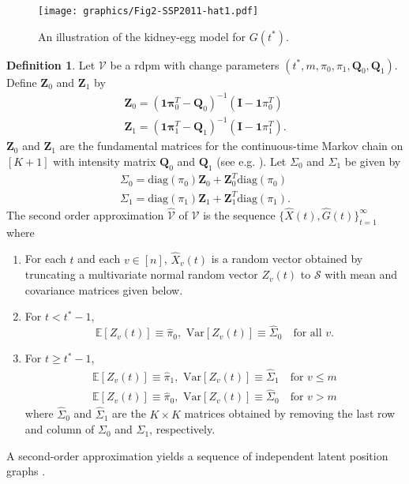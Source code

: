 \documentclass[10pt,journal,compsoc]{IEEEtran}
\theoremstyle{definition}
\newtheorem{definition}{Definition}
\begin{document}
\begin{figure}[!tp]
  \centering
  \texttt{[image: graphics/Fig2-SSP2011-hat1.pdf]}
  \caption{An illustration of the kidney-egg model for $G(t^{*})$.}
  \label{fig:kidney-egg}
\end{figure}
 \begin{definition}
  \label{def:2}
  Let $\mathscr{V}$ be a rdpm with change parameters $(t^{*}, m,
  \pi_0, \pi_1, \mathbf{Q}_0, \mathbf{Q}_1)$. Define
  $\mathbf{Z}_0$ and $\mathbf{Z}_1$ by
  \begin{gather}
    \mathbf{Z}_0 = (\mathbf{1}\mathbf{\pi}_0^{T} -
     \mathbf{Q}_0)^{-1}(\mathbf{I} - \mathbf{1}\pi_0^{T}) \\
    \mathbf{Z}_1 = (\mathbf{1}\mathbf{\pi}_1^{T} -
     \mathbf{Q}_1)^{-1}(\mathbf{I} - \mathbf{1}\pi_1^{T}).
  \end{gather}
  $\mathbf{Z}_0$ and $\mathbf{Z}_1$ are the fundamental matrices
  for the continuous-time Markov chain on $[K+1]$ with intensity
  matrix $\mathbf{Q}_0$ and $\mathbf{Q}_1$ (see
  e.g. \cite[p. 55]{asmussen03:_applied_probab_queues}). Let
  $\Sigma_0$ and $\Sigma_1$ be given by
  \begin{gather*}
    \Sigma_0 = \mathrm{diag}(\pi_0) \mathbf{Z}_0 +
    \mathbf{Z}_0^{T}
    \mathrm{diag}(\pi_0) \\
    \Sigma_1 = \mathrm{diag}(\pi_1) \mathbf{Z}_1 +
    \mathbf{Z}_1^{T}
    \mathrm{diag}(\pi_1).
  \end{gather*}
  The second order approximation $\widehat{\mathscr{V}}$ of
  $\mathscr{V}$ is the sequence $\{\widehat{X}(t),
  \widehat{G}(t)\}_{t=1}^{\infty}$ where
  \begin{enumerate}
  \item For each $t$ and each $v \in [n]$, $\widehat{X}_v(t)$ is a
    random vector obtained by truncating a multivariate normal random
    vector $Z_{v}(t)$ to $\mathscr{S}$ with mean and covariance
    matrices given below.
  \item For $t < t^{*} - 1$,
    \begin{equation}
      \mathbb{E}[Z_v(t)] \equiv \hat{\pi}_0, \,\, 
  \mathrm{Var}[Z_v(t)] \equiv \widehat{\Sigma}_0 \quad \text{for all
    $v$}.
    \end{equation}
  \item For $t \geq t^{*} - 1$,  
    \begin{gather*}
      \mathbb{E}[Z_v(t)] \equiv \hat{\pi}_1, \,\, 
\mathrm{Var}[Z_v(t)] \equiv \widehat{\Sigma}_{1} \quad \text{for $v
  \leq m$} \\
  \mathbb{E}[Z_v(t)] \equiv \hat{\pi}_0, \,\, \mathrm{Var}[Z_v(t)] \equiv \widehat{\Sigma}_{0} \quad \text{for $v
        > m$}
    \end{gather*}
    where $\widehat{\Sigma}_0$ and $\widehat{\Sigma}_1$ are the $K
    \times K$ matrices
    obtained by removing the last row and column of $\Sigma_0$ and
    $\Sigma_1$, respectively. 
  \end{enumerate}
\end{definition}
A second-order approximation yields a sequence of independent latent
position graphs \cite{marchette08:_predic,scheinerman10:_model,hoff02:_laten}. 
\end{document}
